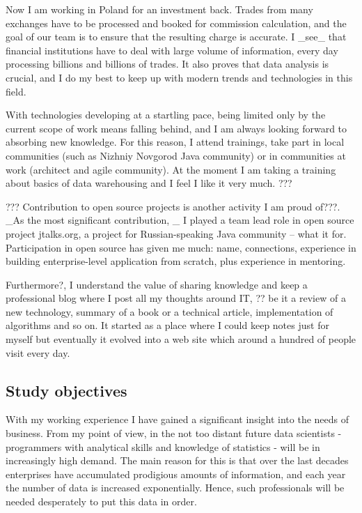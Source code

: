 \documentclass[a4paper,14pt]{extarticle}
\begin{document}
Now I am working in Poland for an investment back. Trades from many exchanges have to be processed and booked for commission calculation, and the goal of our team is to ensure that the resulting charge is accurate. I _see_ that financial institutions have to deal with large volume of information, every day processing billions and billions of trades. It also proves that data analysis is crucial, and I do my best to keep up with modern trends and technologies in this field.

With technologies developing at a startling pace, being limited only by the current scope of work means falling behind, and I am always looking forward to absorbing new knowledge. For this reason, I attend trainings, take part in local communities (such as Nizhniy Novgorod Java community) or in communities at work (architect and agile community). At the moment I am taking a training about basics of data warehousing and I feel I like it very much. ???


???
Contribution to open source projects is another activity I am proud of???. _As the most significant contribution, _ I played a team lead role in open source project jtalks.org, a project for Russian-speaking Java community -- what it for. Participation in open source has given me much: name, connections, experience in building enterprise-level application from scratch, plus experience in mentoring.

Furthermore?, I understand the value of sharing knowledge and keep a professional blog where I post all my thoughts around IT, ?? be it a review of a new technology, summary of a book or a technical article, implementation of algorithms and so on. It started as a place where I could keep notes just for myself but eventually it evolved into a web site which around a hundred of people visit every day.


\subsection*{Study objectives}

With my working experience I have gained a significant insight into the needs of business. From my point of view, in the not too distant future data scientists - programmers with analytical skills and knowledge of statistics - will be in increasingly high demand. The main reason for this is that over the last decades enterprises have accumulated prodigious amounts of information, and each year the number of data is increased exponentially. Hence, such professionals will be needed desperately to put this data in order.
\end{document}
